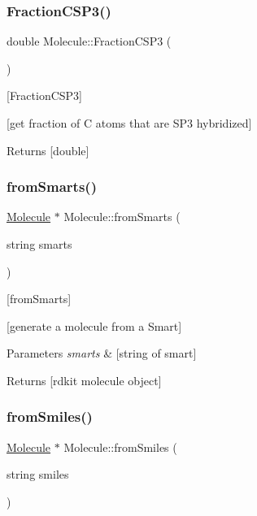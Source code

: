 \subsubsection{\texorpdfstring{Fraction\+C\+S\+P3()}{FractionCSP3()}}
{\footnotesize\ttfamily double Molecule\+::\+Fraction\+C\+S\+P3 (\begin{DoxyParamCaption}{ }\end{DoxyParamCaption})}



\mbox{[}Fraction\+C\+S\+P3\mbox{]} 

\mbox{[}get fraction of C atoms that are S\+P3 hybridized\mbox{]}

\begin{DoxyReturn}{Returns}
\mbox{[}double\mbox{]} 
\end{DoxyReturn}
\mbox{\label{class_molecule_a2edb1181b6a08aa8da482ff6a08ad157}} 
\subsubsection{\texorpdfstring{from\+Smarts()}{fromSmarts()}}
{\footnotesize\ttfamily \mbox{\hyperlink{class_molecule}{Molecule}} $\ast$ Molecule\+::from\+Smarts (\begin{DoxyParamCaption}\item[{string}]{smarts }\end{DoxyParamCaption})\hspace{0.3cm}{\ttfamily [static]}}



\mbox{[}from\+Smarts\mbox{]} 

\mbox{[}generate a molecule from a Smart\mbox{]}


\begin{DoxyParams}{Parameters}
{\em smarts} & \mbox{[}string of smart\mbox{]} \\
\hline
\end{DoxyParams}
\begin{DoxyReturn}{Returns}
\mbox{[}rdkit molecule object\mbox{]} 
\end{DoxyReturn}
\mbox{\label{class_molecule_ab069ae65453c626353782b9accc1235a}} 
\subsubsection{\texorpdfstring{from\+Smiles()}{fromSmiles()}}
{\footnotesize\ttfamily \mbox{\hyperlink{class_molecule}{Molecule}} $\ast$ Molecule\+::from\+Smiles (\begin{DoxyParamCaption}\item[{string}]{smiles }\end{DoxyParamCaption})\hspace{0.3cm}{\ttfamily [static]}}



